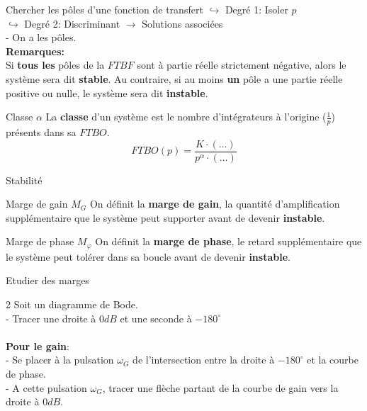 \documentclass{article}
\begin{document}
{\begin{méthode}{Chercher les pôles d'une fonction de transfert}
\hspace*{10pt} $\hookrightarrow$ Degré 1: Isoler $p$\\
\hspace*{10pt} $\hookrightarrow$ Degré 2: Discriminant $\to$ Solutions associées\\
- On a les pôles.\\
\textbf{Remarques:}\\
Si \textbf{tous les} pôles de la $FTBF$ sont à partie réelle strictement négative, alors le système sera dit \textbf{stable}. Au contraire, si au moins \textbf{un} pôle a une partie réelle positive ou nulle, le système sera dit \textbf{instable}.
\end{méthode}
\begin{definition}{Classe $\alpha$}
La \textbf{classe} d'un système est le nombre d'intégrateurs à l'origine ($\frac{1}{p}$) présents dans sa $FTBO$.\vspace*{-10pt}
$$FTBO(p) = \frac{K \cdot (\dots)}{p^\alpha \cdot (\dots)}$$
\end{definition}\vspace*{-10pt}
{}
\begin{center}
{\Large Stabilité}
\end{center}
\begin{definition}{Marge de gain $M_G$}
On définit la \textbf{marge de gain}, la quantité d'amplification supplémentaire que le système peut supporter avant de devenir \textbf{instable}.
\end{definition}
\begin{definition}{Marge de phase $M_\varphi$}
On définit la \textbf{marge de phase}, le retard supplémentaire que le système peut tolérer dans sa boucle avant de devenir \textbf{instable}.
\end{definition}
\begin{méthode}{Etudier des marges}\vspace*{-10pt}
\begin{multicols}{2}
Soit un diagramme de Bode.\\
- Tracer une droite à $0dB$ et une seconde à $-180^\circ$\\\\
\textbf{Pour le gain}:\\
- Se placer à la pulsation $\omega_G$ de l'intersection entre la droite à $-180^\circ$ et la courbe de phase.\\
- A cette pulsation $\omega_G$, tracer une flèche partant de la courbe de gain vers la droite à $0dB$.\\

\end{multicols}
\end{méthode}}
\end{document}
